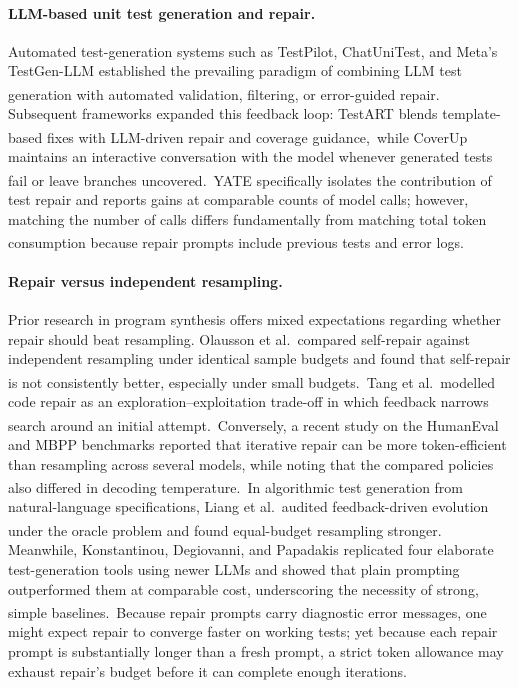 \documentclass[11pt,a4paper]{article}
\newcommand{\ysjcite}[1]{\,\textsuperscript{\cite{#1}}}
\begin{document}
\paragraph{LLM-based unit test generation and repair.}
Automated test-generation systems such as TestPilot, ChatUniTest, and Meta's TestGen-LLM established the prevailing paradigm of combining LLM test generation with automated validation, filtering, or error-guided repair.\ysjcite{schafer2024testpilot,chen2024chatunitest,alshahwan2024testgenllm} Subsequent frameworks expanded this feedback loop: TestART blends template-based fixes with LLM-driven repair and coverage guidance,\ysjcite{gu2024testart} while CoverUp maintains an interactive conversation with the model whenever generated tests fail or leave branches uncovered.\ysjcite{altmayer2025coverup} YATE specifically isolates the contribution of test repair and reports gains at comparable counts of model calls; however, matching the number of calls differs fundamentally from matching total token consumption because repair prompts include previous tests and error logs.\ysjcite{konstantinou2025yate}

\paragraph{Repair versus independent resampling.}
Prior research in program synthesis offers mixed expectations regarding whether repair should beat resampling. Olausson et al.\ compared self-repair against independent resampling under identical sample budgets and found that self-repair is not consistently better, especially under small budgets.\ysjcite{olausson2024selfrepair} Tang et al.\ modelled code repair as an exploration--exploitation trade-off in which feedback narrows search around an initial attempt.\ysjcite{tang2024rex} Conversely, a recent study on the HumanEval and MBPP benchmarks reported that iterative repair can be more token-efficient than resampling across several models, while noting that the compared policies also differed in decoding temperature.\ysjcite{arimbur2026tries} In algorithmic test generation from natural-language specifications, Liang et al.\ audited feedback-driven evolution under the oracle problem and found equal-budget resampling stronger.\ysjcite{liang2026auditing} Meanwhile, Konstantinou, Degiovanni, and Papadakis replicated four elaborate test-generation tools using newer LLMs and showed that plain prompting outperformed them at comparable cost, underscoring the necessity of strong, simple baselines.\ysjcite{konstantinou2026newer} Because repair prompts carry diagnostic error messages, one might expect repair to converge faster on working tests; yet because each repair prompt is substantially longer than a fresh prompt, a strict token allowance may exhaust repair's budget before it can complete enough iterations.
\end{document}
